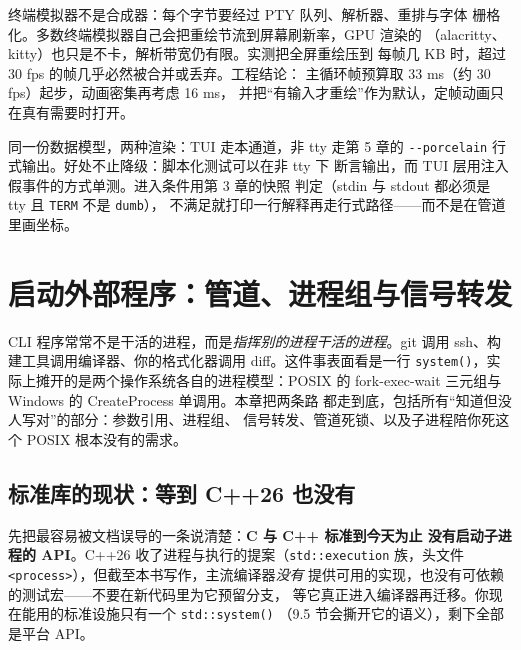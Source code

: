\documentclass[12pt,a4paper,fontset=fandol]{ctexbook}
\newcommand{\cpp}[1]{C++#1}
\newcommand{\Fn}[1]{\texttt{#1()}}
\newcommand{\Tp}[1]{\texttt{#1}}
\newcommand{\Opt}[1]{\texttt{-\/-#1}}
\begin{document}
\begin{note}[title={60 fps 的 TUI 是个谎言}]
终端模拟器不是合成器：每个字节要经过 PTY 队列、解析器、重排与字体
栅格化。多数终端模拟器自己会把重绘节流到屏幕刷新率，GPU 渲染的
（alacritty、kitty）也只是不卡，解析带宽仍有限。实测把全屏重绘压到
每帧几 KB 时，超过 30 fps 的帧几乎必然被合并或丢弃。工程结论：
主循环帧预算取 33 ms（约 30 fps）起步，动画密集再考虑 16 ms，
并把``有输入才重绘''作为默认，定帧动画只在真有需要时打开。
\end{note}

\begin{bestpractice}[title={把 TUI 做成可选外观而非唯一形态}]
同一份数据模型，两种渲染：TUI 走本通道，非 tty 走第 5 章的
\Opt{porcelain} 行式输出。好处不止降级：脚本化测试可以在非 tty 下
断言输出，而 TUI 层用注入假事件的方式单测。进入条件用第 3 章的快照
判定（stdin 与 stdout 都必须是 tty 且 \Tp{TERM} 不是 \Tp{dumb}），
不满足就打印一行解释再走行式路径——而不是在管道里画坐标。
\end{bestpractice}

\chapter{启动外部程序：管道、进程组与信号转发}

CLI 程序常常不是干活的进程，而是\emph{指挥别的进程干活的进程}。git 调用
ssh、构建工具调用编译器、你的格式化器调用 diff。这件事表面看是一行
\Fn{system}，实际上摊开的是两个操作系统各自的进程模型：POSIX 的
fork-exec-wait 三元组与 Windows 的 CreateProcess 单调用。本章把两条路
都走到底，包括所有``知道但没人写对''的部分：参数引用、进程组、
信号转发、管道死锁、以及子进程陪你死这个 POSIX 根本没有的需求。

\section{标准库的现状：等到 \cpp{26} 也没有}

先把最容易被文档误导的一条说清楚：\textbf{C 与 C++ 标准到今天为止
没有启动子进程的 API}。C++26 收了进程与执行的提案（\Tp{std::execution}
族，头文件 \Tp{<process>}），但截至本书写作，主流编译器\emph{没有}
提供可用的实现，也没有可依赖的测试宏——不要在新代码里为它预留分支，
等它真正进入编译器再迁移。你现在能用的标准设施只有一个 \Fn{std::system}
（9.5 节会撕开它的语义），剩下全部是平台 API。
\end{document}
